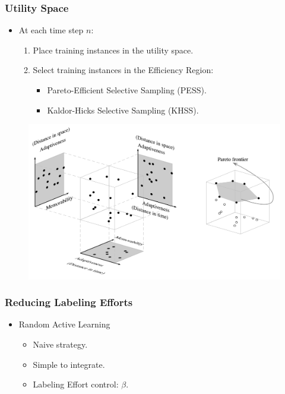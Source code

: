 \documentclass[14pt]{beamer}
\begin{document}
\begin{frame}\frametitle{Utility Space}

\begin{itemize}
\item At each time step $n$:
\begin{enumerate}
\item Place training instances in the utility space.
\item Select training instances in the Efficiency Region:
\begin{itemize}
\item Pareto-Efficient Selective Sampling (PESS).
\item Kaldor-Hicks Selective Sampling (KHSS).
\end{itemize}
\end{enumerate}
\end{itemize}

\vspace{-0.1in}
\begin{figure}
\centering
\includegraphics[scale=0.45]{pareto}
\end{figure}

\end{frame}

\begin{frame}\frametitle{Reducing Labeling Efforts}
\begin{itemize}
\item Random Active Learning
\begin{itemize}
\item Naive strategy.
\item Simple to integrate.
\item Labeling Effort control: $\beta$.
\end{itemize}
\end{itemize}
\end{frame}
\end{document}

